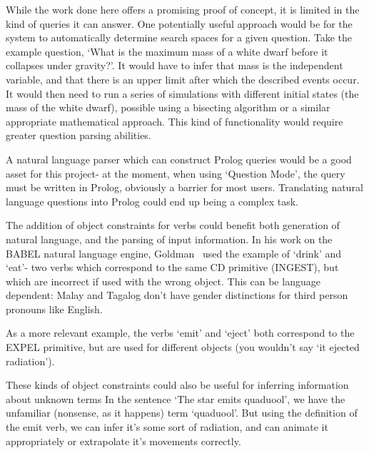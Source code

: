 \documentclass[12pt,MSc,wordcount,twoside]{muthesis}
\begin{document}
    While the work done here offers a promising proof of concept, it is limited in the kind of queries it can answer. One potentially useful approach would be for the system to automatically determine search spaces for a given question. Take the example question, `What is the maximum mass of a white dwarf before it collapses under gravity?'. It would have to infer that mass is the independent variable, and that there is an upper limit after which the described events occur. It would then need to run a series of simulations with different initial states (the mass of the white dwarf), possible using a bisecting algorithm or a similar appropriate mathematical approach. This kind of functionality would require greater question parsing abilities.

    A natural language parser which can construct Prolog queries would be a good asset for this project- at the moment, when using `Question Mode', the query must be written in Prolog, obviously a barrier for most users. Translating natural language questions into Prolog could end up being a complex task.

    The addition of object constraints for verbs could benefit both generation of natural language, and the parsing of input information. In his work on the BABEL natural language engine, Goldman~\cite{GOLDMAN1975289} used the example of `drink' and `eat'- two verbs which correspond to the same CD primitive (INGEST), but which are incorrect if used with the wrong object. This can be language dependent: Malay and Tagalog don't have gender distinctions for third person pronouns like English.

    As a more relevant example, the verbs `emit' and `eject' both correspond to the EXPEL primitive, but are used for different objects (you wouldn't say `it ejected radiation').

    These kinds of object constraints could also be useful for inferring information about unknown terms In the sentence `The star emits quaduool', we have the unfamiliar (nonsense, as it happens) term `quaduool'. But using the definition of the emit verb, we can infer it's some sort of radiation, and can animate it appropriately or extrapolate it's movements correctly.

    
    
\end{document}
